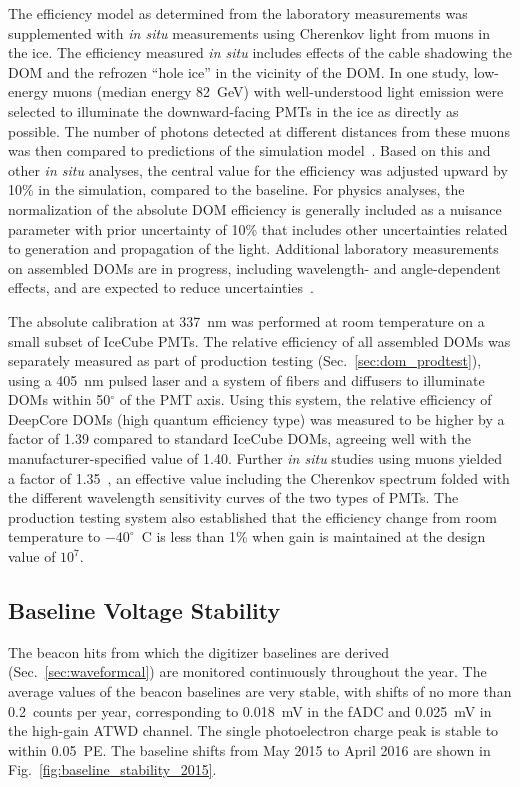 The efficiency model as determined from the laboratory measurements was supplemented with \textit{in
  situ} measurements using Cherenkov light from muons in the ice. The
efficiency measured \textit{in situ} includes effects of the cable
shadowing the DOM and the refrozen ``hole ice'' in the vicinity of the
DOM. In one
study, low-energy muons (median energy 82~GeV) with well-understood light
emission were selected to illuminate the downward-facing PMTs in the ice as
directly as possible. The number of photons detected at different
distances from these muons was then compared to predictions of the
simulation model~\cite{IC3:ereco}.  Based on this and other \textit{in
  situ} analyses, the central value for the efficiency was adjusted upward
by 10\% in the simulation, compared to the baseline.  For physics analyses,
the normalization of the absolute DOM efficiency is generally included as a
nuisance parameter with prior uncertainty of 10\% that includes other uncertainties related to
generation and propagation of the light. Additional laboratory measurements
on assembled DOMs are in progress, including wavelength- and angle-dependent
effects, and are expected to reduce uncertainties~\cite{ICECUBE:DOMEFF}.

The absolute calibration at 337~nm was performed at room temperature on a
small subset of IceCube PMTs. The relative efficiency of all assembled DOMs
was separately measured as part of production testing
(Sec.~\ref{sec:dom_prodtest}), using a 405~nm pulsed laser and a system of
fibers and diffusers to illuminate DOMs within 50$^{\circ}$ of the
PMT axis.  Using this system, the relative efficiency of DeepCore DOMs
(high quantum efficiency type) was measured to be higher by a factor
of 1.39
compared to standard IceCube DOMs, agreeing well with the
manufacturer-specified value of 1.40. Further \textit{in situ} studies
using muons yielded a factor of 1.35~\cite{ICECUBE:DC}, an
effective value including the Cherenkov spectrum folded with the different
wavelength sensitivity curves of the two types of PMTs.  The production
testing system also established that the efficiency change from room
temperature to $-40^{\circ}$~C is less than 1\% when gain is maintained at
the design value of $10^7$.

\subsection{\label{sec:baselines}Baseline Voltage Stability}

The beacon hits from which the digitizer baselines are derived
(Sec.~\ref{sec:waveformcal}) are 
monitored continuously throughout the year. The average values of the
beacon baselines are very stable, with shifts of no more than
0.2~counts per year, corresponding to 0.018~mV in the fADC and
0.025~mV in the high-gain ATWD channel. The single photoelectron
charge peak is stable to within 0.05~PE. The baseline shifts from May
2015 to April 2016 are shown in Fig.~\ref{fig:baseline_stability_2015}. 

